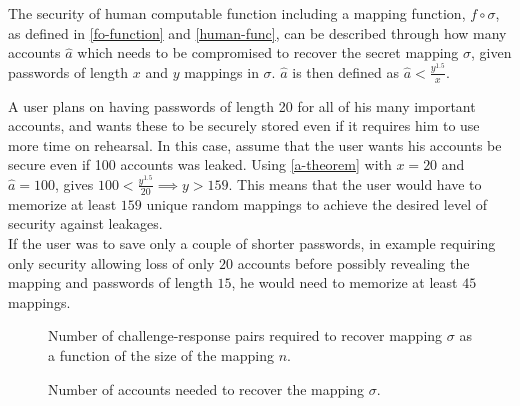 \begin{theorem}
    \label{security-param1}
    The security of human computable function including a mapping function, $f \circ \sigma$, as defined in \autoref{fo-function} and \autoref{human-func}, can be described through how many accounts $\hat a$ which needs to be compromised to recover the secret mapping $\sigma$, given passwords of length $x$ and $y$ mappings in $\sigma$. $\hat a$ is then defined as
    $ \hat a < \frac{y^{ 1.5 }}{x} $.
    \label{a-theorem}
\end{theorem}

\begin{example}
    A user plans on having passwords of length 20 for all of his many important accounts, and wants these to be securely stored even if it requires him to use more time on rehearsal. In this case, assume that the user wants his accounts be secure even if 100 accounts was leaked. Using \autoref{a-theorem} with $x=20$ and $\hat a = 100$, gives $100 < \frac{y^{1.5}}{20} \implies y > 159$. This means that the user would have to memorize at least $159$ unique random mappings to achieve the desired level of security against leakages. \\
    If the user was to save only a couple of shorter passwords, in example requiring only security allowing loss of only $20$ accounts before possibly revealing the mapping and passwords of length $15$, he would need to memorize at least $45$ mappings. 
\end{example}

\begin{figure}
\caption{Number of challenge-response pairs required to recover mapping $\sigma$ as a function of the size of the mapping $n$. }
\label{trade-off1}
\end{figure}

\begin{figure}
\caption{Number of accounts needed to recover the mapping $\sigma$.}
\label{trade-off2}
\end{figure}


